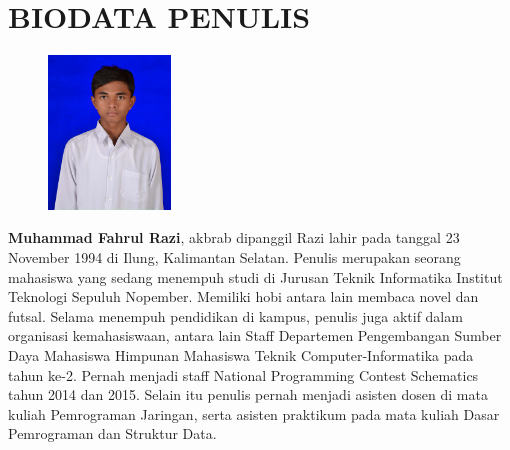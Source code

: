 \documentclass[12pt,oneside,reqno]{ta-its}
\begin{document}
\renewcommand{\thelstlisting}{\arabic{chapter}.\arabic{lstlisting}}
	\frontmatter %
	\maketitle
	\legalityPaper %
	
    
	

	\cleardoublepage %

	\tableofcontents %
	\listoftables %
	\listoffigures %
	\lstlistoflistings %

	\mainmatter
	
	
	
	
	
	

	
	
    
    \renewcommand\chaptername{LAMPIRAN}
	\appendix
    
    

	\appendix

	\backmatter %
	\chapter{BIODATA PENULIS}
		\begin{figure}
			\includegraphics[width=0.29\textwidth]{Images/MFR.jpg}
		\end{figure}
		
		\textbf{Muhammad Fahrul Razi}, akbrab dipanggil Razi lahir pada tanggal 23 November 1994 di Ilung, Kalimantan Selatan. Penulis merupakan seorang mahasiswa yang sedang menempuh studi di Jurusan Teknik Informatika Institut Teknologi Sepuluh Nopember. Memiliki hobi antara lain membaca novel dan futsal. Selama menempuh pendidikan di kampus, penulis juga aktif dalam organisasi kemahasiswaan, antara lain Staff Departemen Pengembangan Sumber Daya Mahasiswa Himpunan Mahasiswa Teknik Computer-Informatika pada tahun ke-2. Pernah menjadi staff National Programming Contest Schematics tahun 2014 dan 2015. Selain itu penulis pernah menjadi asisten dosen di mata kuliah Pemrograman Jaringan, serta asisten praktikum pada mata kuliah Dasar Pemrograman dan Struktur Data.
\end{document}

